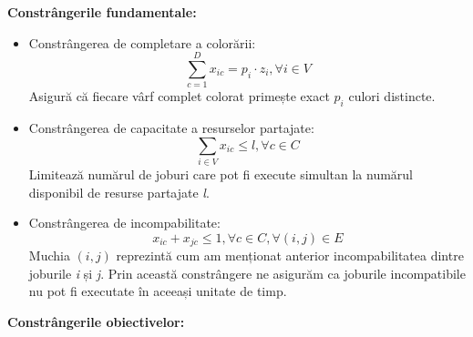     {\bf Constrângerile fundamentale:}
    \begin{itemize}
    \item Constrângerea de completare a colorării:
    \begin{equation}
      \sum_{c=1}^{D} x_{ic}= p_i \cdot z_i, \forall i \in V
    \end{equation}
    Asigură că fiecare vârf complet colorat primește exact $p_i$ culori distincte.

    \item Constrângerea de capacitate a resurselor partajate:
    \begin{equation}
    \sum_{i \in V} x_{ic} \leq l, \forall c \in C
    \end{equation}
    Limitează numărul de joburi care pot fi execute simultan la numărul disponibil de resurse partajate \textit{l}.

    \item Constrângerea de incompabilitate:
    \begin{equation}
     x_{ic} + x_{jc} \leq 1, \forall c \in C, \forall (i,j) \in E
    \end{equation}
    Muchia $(i,j)$ reprezintă cum am menționat anterior incompabilitatea dintre joburile \textit{i} și \textit{j}. Prin această constrângere ne asigurăm ca joburile incompatibile nu pot fi executate în aceeași unitate de timp.      
    \end{itemize}
    {\bf Constrângerile obiectivelor:}

